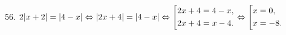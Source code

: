 56. $2|x+2|=|4-x|\Leftrightarrow|2x+4|=|4-x|\Leftrightarrow\left[\begin{gathered}
     2x+4=4-x,\hfill\\
     2x+4=x-4.\hfill \end{gathered}\right.\Leftrightarrow\left[\begin{gathered}
     x=0,\hfill\\
     x=-8.\hfill \end{gathered}\right.$\\
